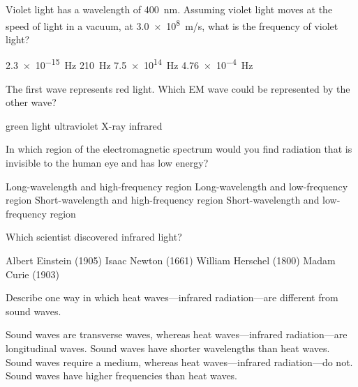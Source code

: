 \documentclass{exam}
\begin{document}
\begin{questions}
\question
Violet light has a wavelength of \SI{400}{nm}. Assuming violet light moves at the speed of light in a vacuum, at \SI{3.0e8}{m/s}, what is the frequency of violet light?

\begin{choices}
\choice \SI{2.3e-15}{Hz}
\choice \SI{210}{Hz}
\correctchoice \SI{7.5e14}{Hz}
\choice \SI{4.76e-4}{Hz}
\end{choices}

\clearpage
\question 
The first wave represents red light. Which EM wave could be represented by the other wave?

\begin{center}
    \centering
\end{center}

\begin{choices}
\choice green light
\choice ultraviolet
\choice X-ray
\correctchoice infrared
\end{choices}

\question %
In which region of the electromagnetic spectrum would you find radiation that is invisible to the human eye and has low energy?

\begin{choices}
\choice Long-wavelength and high-frequency region
\CorrectChoice Long-wavelength and low-frequency region
\choice Short-wavelength and high-frequency region
\choice Short-wavelength and low-frequency region
\end{choices}

\question
Which scientist discovered infrared light?

\begin{choices}
\choice Albert Einstein (1905)
\choice Isaac Newton (1661)
\correctchoice William Herschel (1800)
\choice Madam Curie (1903)
\end{choices}

\question %
Describe one way in which heat waves---infrared radiation---are different from sound waves.

\begin{choices}
\choice Sound waves are transverse waves, whereas heat waves---infrared radiation---are longitudinal waves.
\choice Sound waves have shorter wavelengths than heat waves.
\CorrectChoice Sound waves require a medium, whereas heat waves---infrared radiation---do not.
\choice Sound waves have higher frequencies than heat waves.
\end{choices}


\end{questions}
\end{document}
